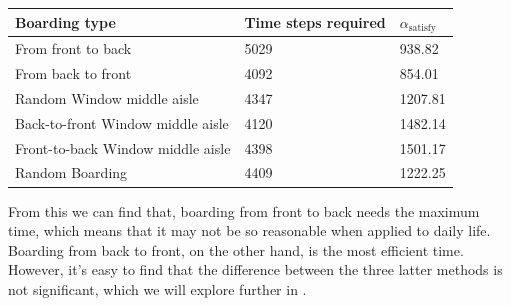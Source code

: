 \documentclass{article}
\theoremstyle{definition}
\theoremstyle{remark}
\numberwithin{equation}{section}
\begin{document}
	\begin{center}
	\begin{tabular}{l|l|l}
		\hline
		Boarding type&Time steps required&$\alpha_\text{satisfy}$\\
		\hline
		From front to back&5029&938.82\\
		From back to front&4092&854.01\\
		Random Window middle aisle&4347&1207.81\\
		Back-to-front Window middle aisle&4120&1482.14\\
		Front-to-back Window middle aisle&4398&1501.17\\
		Random Boarding&4409&1222.25\\
		\hline
	\end{tabular}
	\end{center}
	From this we can find that, boarding from front to back needs the maximum time, which means that it may not be so reasonable when applied to daily life. Boarding from back to front, on the other hand, is the most  efficient time. However, it's easy to find that the difference between the three latter methods is not significant, which we will explore further in .
\end{document}
